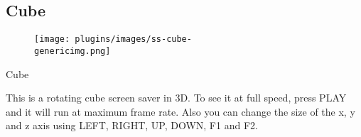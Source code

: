 \subsection{Cube}
\begin{figure}[h!]
\begin{center}
\texttt{[image: plugins/images/ss-cube-\\genericimg.png]}
\end{center}
\end{figure}
Cube

This is a rotating cube screen saver in 3D.
To see it at full speed, press PLAY and it will run at maximum frame rate. Also you can change the size of the x, y and z axis using  LEFT, RIGHT, UP, DOWN, F1 and F2.
